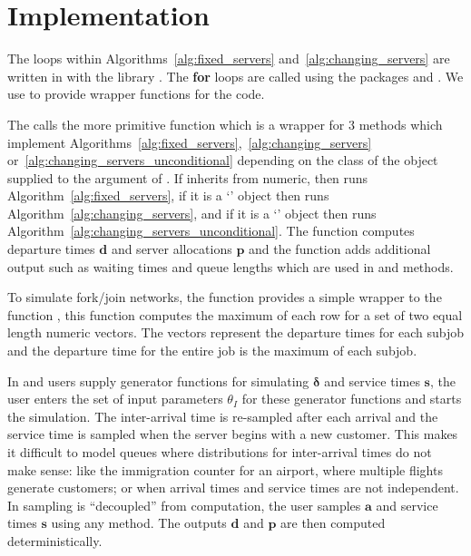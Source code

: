 \documentclass[article]{jss}
\begin{document}
\section{Implementation} \label{sec:Implementation}

The  loops within Algorithms~\ref{alg:fixed_servers}
and~\ref{alg:changing_servers} are written in  with the
 library \citep{sanderson2016armadillo}. The
 \textbf{for} loops are called using the 
packages  \citep{eddelbuettel2011rcpp} and
 \citep{eddelbuettel2014rcpparmadillo}. We use
 to provide wrapper functions for the  code.

The  calls the more primitive  function
which is a wrapper for 3 methods which implement
Algorithms~\ref{alg:fixed_servers},~\ref{alg:changing_servers}
or~\ref{alg:changing_servers_unconditional} depending on the class of
the object supplied to the  argument of
. If  inherits from numeric, then
 runs Algorithm~\ref{alg:fixed_servers}, if it is a
`' object then  runs
Algorithm~\ref{alg:changing_servers}, and if it is a
`' object then  runs
Algorithm~\ref{alg:changing_servers_unconditional}. The 
function computes departure times $\mathbf{d}$ and server allocations
$\mathbf{p}$ and the  function adds additional
output such as waiting times and queue lengths which are used in
 and  methods.

To simulate fork/join networks, the  function
 provides a simple wrapper to the  function
, this function computes the maximum of each row for a
set of two equal length numeric vectors. The vectors represent the
departure times for each subjob and the departure time for the entire
job is the maximum of each subjob.

In  and  users supply generator functions for
simulating $\boldsymbol{\delta}$ and service times $\mathbf{s}$, the user
enters the set of input parameters $\theta_I$ for these generator
functions and starts the simulation. The inter-arrival time is
re-sampled after each arrival and the service time is sampled when the
server begins with a new customer. This makes it difficult to model
queues where distributions for inter-arrival times do not make sense:
like the immigration counter for an airport, where multiple flights
generate customers; or when arrival times and service times are not
independent. In  sampling is ``decoupled'' from
computation, the user samples $\mathbf{a}$ and service times
$\mathbf{s}$ using any method. The outputs $\mathbf{d}$ and
$\mathbf{p}$ are then computed deterministically.
\end{document}
